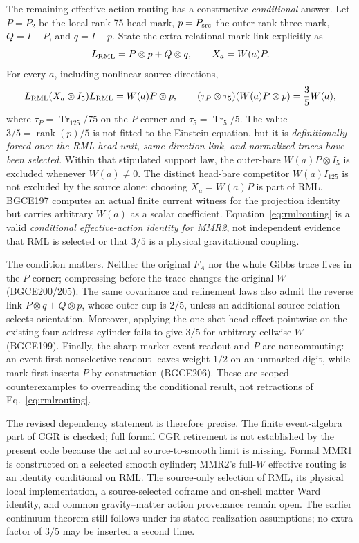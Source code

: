 \documentclass[11pt]{article}
\theoremstyle{definition}
\theoremstyle{remark}
\begin{document}
The remaining effective-action routing has a constructive \emph{conditional} answer. Let $P=P_2$ be the local rank-75 head mark, $p=P_{\rm src}$ the outer rank-three mark, $Q=I-P$, and $q=I-p$. State the extra relational mark link explicitly as
\begin{equation}\label{eq:rml}
 L_{\rm RML}=P\otimes p+Q\otimes q,
 \qquad X_a=W(a)P .
\end{equation}
For every $a$, including nonlinear source directions,
\begin{equation}\label{eq:rmlrouting}
 L_{\rm RML}(X_a\otimes I_5)L_{\rm RML}=W(a)P\otimes p,
 \qquad (\tau_P\otimes\tau_5)(W(a)P\otimes p)=\frac35 W(a),
\end{equation}
where $\tau_P=\operatorname{Tr}_{125}/75$ on the $P$ corner and $\tau_5=\operatorname{Tr}_5/5$. The value $3/5=\operatorname{rank}(p)/5$ is not fitted to the Einstein equation, but it is \emph{definitionally forced once the RML head unit, same-direction link, and normalized traces have been selected}. Within that stipulated support law, the outer-bare $W(a)P\otimes I_5$ is excluded whenever $W(a)\neq0$. The distinct head-bare competitor $W(a)I_{125}$ is not excluded by the source alone; choosing $X_a=W(a)P$ is part of RML. BGCE197 computes an actual finite current witness for the projection identity but carries arbitrary $W(a)$ as a scalar coefficient. Equation~\eqref{eq:rmlrouting} is a valid \emph{conditional effective-action identity for MMR2}, not independent evidence that RML is selected or that $3/5$ is a physical gravitational coupling.

The condition matters. Neither the original $F_A$ nor the whole Gibbs trace lives in the $P$ corner; compressing before the trace changes the original $W$ (BGCE200/205). The same covariance and refinement laws also admit the reverse link $P\otimes q+Q\otimes p$, whose outer cup is $2/5$, unless an additional source relation selects orientation. Moreover, applying the one-shot head effect pointwise on the existing four-address cylinder fails to give $3/5$ for arbitrary cellwise $W$ (BGCE199). Finally, the sharp marker-event readout and $P$ are noncommuting: an event-first nonselective readout leaves weight $1/2$ on an unmarked digit, while mark-first inserts $P$ by construction (BGCE206). These are scoped counterexamples to overreading the conditional result, not retractions of Eq.~\eqref{eq:rmlrouting}.

The revised dependency statement is therefore precise. The finite event-algebra part of CGR is checked; full formal CGR retirement is not established by the present code because the actual source-to-smooth limit is missing. Formal MMR1 is constructed on a selected smooth cylinder; MMR2's full-$W$ effective routing is an identity conditional on RML. The source-only selection of RML, its physical local implementation, a source-selected coframe and on-shell matter Ward identity, and common gravity--matter action provenance remain open. The earlier continuum theorem still follows under its stated realization assumptions; no extra factor of $3/5$ may be inserted a second time.
\end{document}
